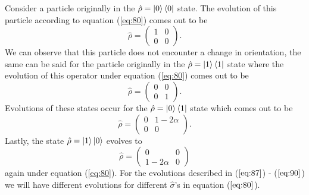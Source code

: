\documentclass[twocolumn]{article}
\begin{document}
Consider a particle originally in the $\hat{\rho}=\ket{0}\bra{0}$ state. The evolution of this particle according to equation (\ref{eq:80}) comes out to be
\begin{equation} \label{eq:87}
\hat{\rho}=
\begin{pmatrix}
1 & 0 \\
0 & 0
\end{pmatrix}.
\end{equation}
We can observe that this particle does not encounter a change in orientation, the same can be said for the particle originally in the $\hat{\rho}=\ket{1}\bra{1}$ state where the evolution of this operator under equation (\ref{eq:80}) comes out to be
\begin{equation} \label{eq:88}
\hat{\rho}=
\begin{pmatrix}
0 & 0 \\
0 & 1
\end{pmatrix}.
\end{equation}
Evolutions of these states occur for the $\hat{\rho}=\ket{0}\bra{1}$ state which comes out to be
\begin{equation} \label{eq:89}
\hat{\rho}=
\begin{pmatrix}
0 & 1-2\alpha \\
0 & 0
\end{pmatrix}.
\end{equation}
Lastly, the state $\hat{\rho}=\ket{1}\ket{0}$ evolves to 
\begin{equation} \label{eq:90}
\hat{\rho}=
\begin{pmatrix}
0 & 0 \\
1-2\alpha & 0
\end{pmatrix}
\end{equation}
again under equation (\ref{eq:80}). For the evolutions described in ($\ref{eq:87}$) - ($\ref{eq:90}$) we will have different evolutions for different $\hat{\sigma}$'s in equation ($\ref{eq:80}$).
\end{document}
